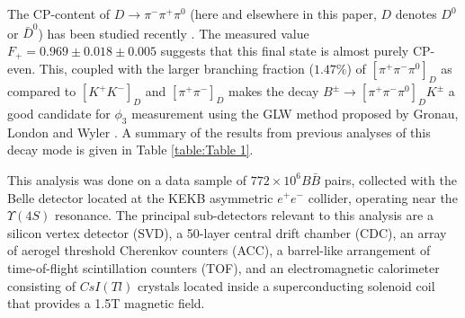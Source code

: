 \documentclass[aps,prl,twocolumn,superscriptaddress,showpacs,preprintnumbers,amsmath,amssymb]{revtex4}
\begin{document}
The CP-content of $D \rightarrow \pi^- \pi^+ \pi^0$ (here and elsewhere in this paper, $D$ denotes $D^0$ or $\bar{D}^0$) has been studied recently \cite{Fplus}. The measured value $F_+ = 0.969 \pm 0.018 \pm 0.005$ suggests that this final state is almost purely CP-even. This, coupled with the larger branching fraction ($1.47\%$) of $[\pi^+ \pi^- \pi^0]_D$ as compared to $[K^+ K^-]_D$ and $[\pi^+ \pi^- ]_D$ makes the decay $B^{\pm} \rightarrow [\pi^+ \pi^- \pi^0]_{D} K^{\pm}$ a good candidate for $\phi_3$ measurement using the GLW method proposed by Gronau, London and Wyler \cite{GLW}. A summary of the results from previous analyses of this decay mode is given in Table \ref{table:Table 1}. 

\begin{table}[htb]
\caption{Summary of results from other analyses of $B^{\pm} \rightarrow [\pi^+ \pi^- \pi^0]_{D} K^{\pm}$ \cite{HFAG}}
\centering
{}
\label{table:Table 1}
\end{table}

This analysis was done on a data sample of $772 \times 10^6 B\bar{B}$ pairs, collected with the Belle detector located at the KEKB asymmetric $e^+ e^-$ collider, operating near the $\Upsilon (4S)$ resonance. The principal sub-detectors relevant to this analysis are a silicon vertex detector (SVD), a 50-layer central drift chamber (CDC), an array of aerogel threshold Cherenkov counters (ACC), a barrel-like arrangement of time-of-flight scintillation counters (TOF), and an electromagnetic calorimeter consisting of $CsI(Tl)$ crystals located inside a superconducting solenoid coil that provides a 1.5T magnetic field. 
\end{document}

